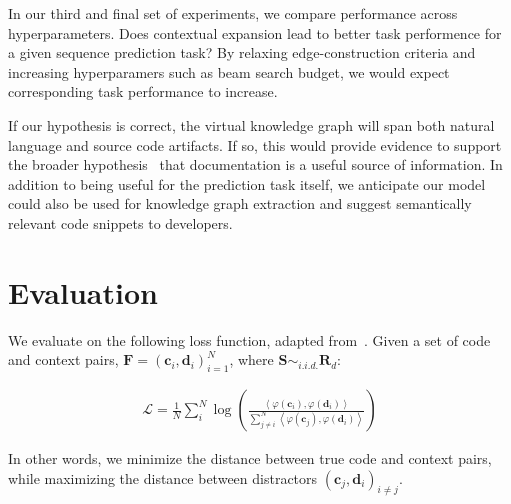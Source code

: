 \documentclass[11pt]{article}
\begin{document}
In our third and final set of experiments, we compare performance across hyperparameters. Does contextual expansion lead to better task performence for a given sequence prediction task? By relaxing edge-construction criteria and increasing hyperparamers such as beam search budget, we would expect corresponding task performance to increase.

If our hypothesis is correct, the virtual knowledge graph will span both natural language and source code artifacts. If so, this would provide evidence to support the broader hypothesis~\citep{guo2017semantically} that documentation is a useful source of information. In addition to being useful for the prediction task itself, we anticipate our model could also be used for knowledge graph extraction and suggest semantically relevant code snippets to developers.

\section{Evaluation}

We evaluate on the following loss function, adapted from~\citep{husain2019codesearchnet}. Given a set of code and context pairs, $\mathbf{F} = (\mathbf{c}_i, \mathbf{d}_i)_{i = 1}^N$, where $\mathbf S \sim_{i.i.d.} \mathbf R_{d}$:

\begin{align}
  \mathcal{L} = \frac{1}{N}\sum_i^N \log\left(\frac{\left<\varphi(\mathbf{c}_i), \varphi(\mathbf{d}_i)\right>}{\sum_{j \neq i}^N \left<\varphi(\mathbf{c}_j), \varphi(\mathbf{d}_i)\right>}\right)
\end{align}

In other words, we minimize the distance between true code and context pairs, while maximizing the distance between distractors $(\mathbf c_j, \mathbf d_i)_{i \neq j}$.

%
%
\end{document}
